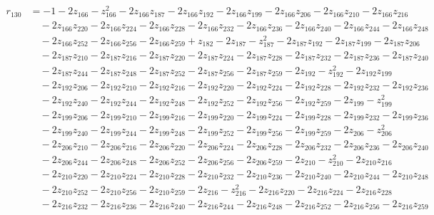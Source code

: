 \begin{align*}
r_{130} &= -1 - 2z_{166} - z_{166}^{2} - 2z_{166}z_{187} - 2z_{166}z_{192} - 2z_{166}z_{199} - 2z_{166}z_{206} - 2z_{166}z_{210} - 2z_{166}z_{216} \\
&\quad  - 2z_{166}z_{220} - 2z_{166}z_{224} - 2z_{166}z_{228} - 2z_{166}z_{232} - 2z_{166}z_{236} - 2z_{166}z_{240} - 2z_{166}z_{244} - 2z_{166}z_{248} \\
&\quad  - 2z_{166}z_{252} - 2z_{166}z_{256} - 2z_{166}z_{259} + z_{182} - 2z_{187} - z_{187}^{2} - 2z_{187}z_{192} - 2z_{187}z_{199} - 2z_{187}z_{206} \\
&\quad  - 2z_{187}z_{210} - 2z_{187}z_{216} - 2z_{187}z_{220} - 2z_{187}z_{224} - 2z_{187}z_{228} - 2z_{187}z_{232} - 2z_{187}z_{236} - 2z_{187}z_{240} \\
&\quad  - 2z_{187}z_{244} - 2z_{187}z_{248} - 2z_{187}z_{252} - 2z_{187}z_{256} - 2z_{187}z_{259} - 2z_{192} - z_{192}^{2} - 2z_{192}z_{199} \\
&\quad  - 2z_{192}z_{206} - 2z_{192}z_{210} - 2z_{192}z_{216} - 2z_{192}z_{220} - 2z_{192}z_{224} - 2z_{192}z_{228} - 2z_{192}z_{232} - 2z_{192}z_{236} \\
&\quad  - 2z_{192}z_{240} - 2z_{192}z_{244} - 2z_{192}z_{248} - 2z_{192}z_{252} - 2z_{192}z_{256} - 2z_{192}z_{259} - 2z_{199} - z_{199}^{2} \\
&\quad  - 2z_{199}z_{206} - 2z_{199}z_{210} - 2z_{199}z_{216} - 2z_{199}z_{220} - 2z_{199}z_{224} - 2z_{199}z_{228} - 2z_{199}z_{232} - 2z_{199}z_{236} \\
&\quad  - 2z_{199}z_{240} - 2z_{199}z_{244} - 2z_{199}z_{248} - 2z_{199}z_{252} - 2z_{199}z_{256} - 2z_{199}z_{259} - 2z_{206} - z_{206}^{2} \\
&\quad  - 2z_{206}z_{210} - 2z_{206}z_{216} - 2z_{206}z_{220} - 2z_{206}z_{224} - 2z_{206}z_{228} - 2z_{206}z_{232} - 2z_{206}z_{236} - 2z_{206}z_{240} \\
&\quad  - 2z_{206}z_{244} - 2z_{206}z_{248} - 2z_{206}z_{252} - 2z_{206}z_{256} - 2z_{206}z_{259} - 2z_{210} - z_{210}^{2} - 2z_{210}z_{216} \\
&\quad  - 2z_{210}z_{220} - 2z_{210}z_{224} - 2z_{210}z_{228} - 2z_{210}z_{232} - 2z_{210}z_{236} - 2z_{210}z_{240} - 2z_{210}z_{244} - 2z_{210}z_{248} \\
&\quad  - 2z_{210}z_{252} - 2z_{210}z_{256} - 2z_{210}z_{259} - 2z_{216} - z_{216}^{2} - 2z_{216}z_{220} - 2z_{216}z_{224} - 2z_{216}z_{228} \\
&\quad  - 2z_{216}z_{232} - 2z_{216}z_{236} - 2z_{216}z_{240} - 2z_{216}z_{244} - 2z_{216}z_{248} - 2z_{216}z_{252} - 2z_{216}z_{256} - 2z_{216}z_{259} \\

\end{align*}
